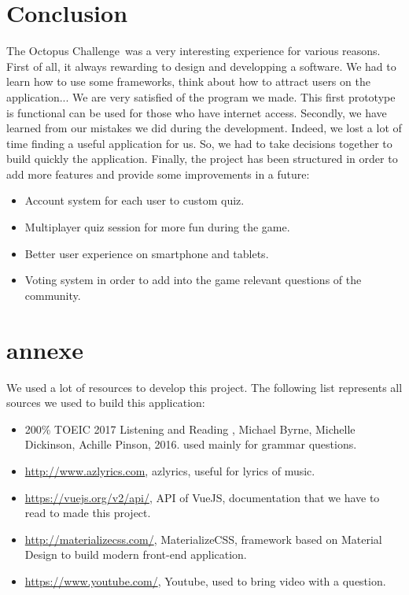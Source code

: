 \documentclass[a4paper,11pt, oneside]{book}
\def\appName{The Octopus Challenge}
\begin{document}
\chapter{Conclusion}
\appName \ was a very interesting experience for various reasons.
First of all, it always rewarding to design and developping a software. We had to learn how to use some frameworks, think about how to attract users on the application...
We are very satisfied of the program we made. This first prototype is functional can be used for those who have internet access. Secondly, we have learned from our mistakes we did during the development.
Indeed, we lost a lot of time finding a useful application for us. So, we had to take decisions together to build quickly the application. Finally, the project has been structured in order
to add more features and provide some improvements in a future:
\begin{itemize}
	\item Account system for each user to custom quiz.
	\item Multiplayer quiz session for more fun during the game.
	\item Better user experience on smartphone and tablets.
	\item Voting system in order to add into the game relevant questions of the community.
\end{itemize}

\chapter{annexe}

We used a lot of resources to develop this project.
The following list represents all sources we used to build this application:
\begin{itemize}
	\item 200\% TOEIC 2017 Listening and Reading , Michael Byrne, Michelle Dickinson, Achille Pinson, 2016. used mainly for grammar questions.
	\item \href{http://www.azlyrics.com}{http://www.azlyrics.com}, azlyrics, useful for lyrics of music.
	\item \href{https://vuejs.org/v2/api/}{https://vuejs.org/v2/api/}, API of VueJS, documentation that we have to read to made this project.
	\item \href{http://materializecss.com/}{http://materializecss.com/}, MaterializeCSS, framework based on Material Design to build modern front-end application.
	\item \href{https://www.youtube.com/}{https://www.youtube.com/}, Youtube, used to bring video with a question.
\end{itemize}
\end{document}
